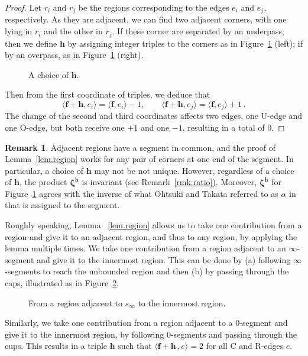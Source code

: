 \documentclass[12pt,reqno]{amsart}
\theoremstyle{definition}
\newtheorem{remark}[theorem]{Remark}
\begin{document}
\begin{proof}
Let $r_i$ and $r_j$ be the regions corresponding to the edges $e_i$ and $e_j$,
respectively. As they are adjacent, we can find two adjacent corners, with one lying
in $r_i$ and the other in $r_j$. If these corner are separated by an underpass, then
we define $\boldsymbol h$ by assigning integer triples to the corners as in
Figure~\ref{fig.crossing3} (left); if by an overpass, as in Figure~\ref{fig.crossing3}
(right). 
\begin{figure}[htpb!]

\caption{A choice of $\boldsymbol h$.}
\label{fig.crossing3}
\end{figure}
	
\noindent
Then from the first coordinate of triples, we deduce that
\begin{equation*}
  \langle {\boldsymbol f + \boldsymbol h}, e_i\rangle = \langle {\boldsymbol f},
  e_i \rangle -1, \quad  \quad  \langle {\boldsymbol f + \boldsymbol h}, e_j \rangle
  = \langle {\boldsymbol f}, e_j \rangle +1 \, .
\end{equation*}
The change of the second and third coordinates affects two edges, one U-edge and one
O-edge, but both receive one $+1$ and one $-1$, resulting in a total of 0.
\end{proof}

\begin{remark}
Adjacent regions have a segment in common, and the proof of Lemma~\ref{lem.region}
works for any pair of corners at one end of the segment. In particular,  a choice of
$\boldsymbol h$ may not be not unique. However, regardless of a choice of
$\boldsymbol h$, the product ${\boldsymbol \zeta}^{\boldsymbol h}$ is invariant (see
Remark~\ref{rmk.ratio}).
Moreover, ${\boldsymbol \zeta}^{\boldsymbol h}$ for Figure~\ref{fig.crossing3} agrees
with the inverse of what Ohtsuki and Takata referred to as $\alpha$ in \cite{OT2015}
that is assigned to the segment.
\end{remark}

Roughly speaking, Lemma ~\ref{lem.region} allows us to take one contribution from a
region and give it to an adjacent region, and thus to any region, by applying the
lemma multiple times.
We take one contribution from a region adjacent to an $\infty$-segment and give it
to the innermost region.  This can be done by (a) following $\infty$-segments to
reach the unbounded region and then (b) by passing through the caps, illustrated as
in Figure~\ref{fig.cup}.
\begin{figure}[htpb!]

\caption{From a region adjacent to $s_\infty$ to the innermost region.}
\label{fig.cup}
\end{figure}
Similarly, we take one contribution from a region adjacent to a $0$-segment and give
it to the innermost region, by following $0$-segments and passing through the cups.
This results in a triple $\boldsymbol h$ such that
$\langle \boldsymbol f+\boldsymbol h \, , e \rangle = 2$
for all C and R-edges $e$.
\end{document}
